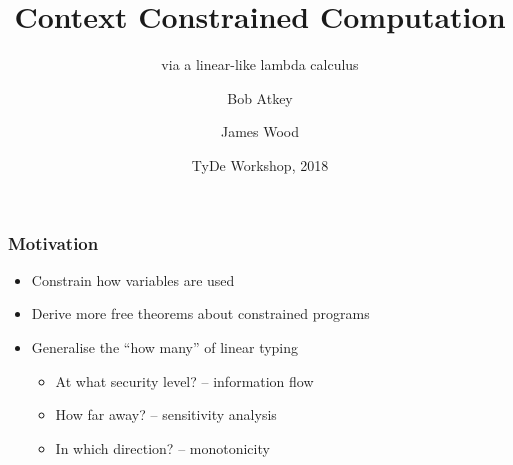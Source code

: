 \documentclass{beamer}
\title{Context Constrained Computation}
\subtitle{via a linear-like lambda calculus}
\author{Bob Atkey\inst{1} \and James Wood\inst{1}}
\institute{\inst{1}University of Strathclyde}
\date{TyDe Workshop, 2018}
\begin{document}
  \frame{\titlepage}
  \begin{frame}
    \frametitle{Motivation}

    \begin{itemize}
    \item Constrain how variables are used
    \item Derive more free theorems about constrained programs
    \item Generalise the ``how many'' of linear typing \pause
      \begin{itemize}
      \item At what security level? -- information flow \pause
      \item How far away? -- sensitivity analysis \pause
      \item In which direction? -- monotonicity
      \end{itemize}
    \end{itemize}
  \end{frame}
\end{document}
